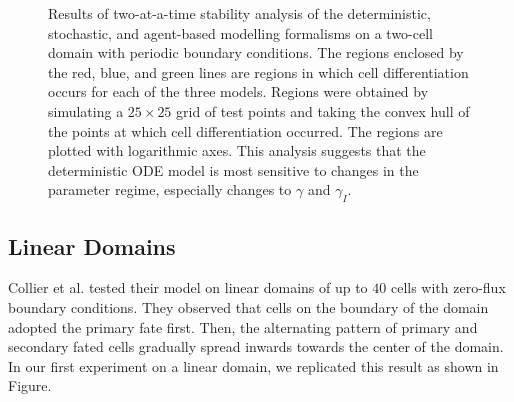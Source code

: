 \documentclass{article}
\begin{document}
\begin{figure}[!htp]
   \caption{Results of two-at-a-time stability analysis of the deterministic, stochastic, and agent-based modelling formalisms on a two-cell domain with periodic boundary conditions. The regions enclosed by the red, blue, and green lines are regions in which cell differentiation occurs for each of the three models. Regions were obtained by simulating a $25 \times 25$ grid of test points and taking the convex hull of the points at which cell differentiation occurred. The regions are plotted with logarithmic axes. This analysis suggests that the deterministic ODE model is most sensitive to changes in the parameter regime, especially changes to $\gamma$ and $\gamma_{I}$.} 
   \label{fig:stability-analysis}
\end{figure}

\subsection*{Linear Domains}

Collier et al. \cite{collier_pattern_1996} tested their model on linear domains of up to $40$ cells with zero-flux boundary conditions.
They observed that cells on the boundary of the domain adopted the primary fate first.
Then, the alternating pattern of primary and secondary fated cells gradually spread inwards towards the center of the domain.
In our first experiment on a linear domain, we replicated this result as shown in Figure.
\end{document}
